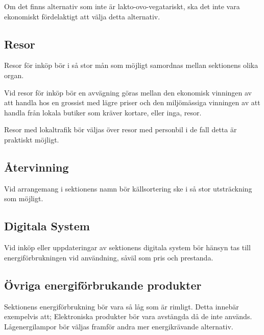\documentclass[11pt, includeaddress]{classes/cthit}
\begin{document}
Om det finns alternativ som inte är lakto-ovo-vegatariskt, ska det inte vara ekonomiskt fördelaktigt att välja detta alternativ.

\subsection{Resor}
Resor för inköp bör i så stor mån som möjligt samordnas mellan sektionens olika organ.

Vid resor för inköp bör en avvägning göras mellan den ekonomisk vinningen av att handla hos en
grossist med lägre priser och den miljömässiga vinningen av att handla från lokala butiker som
kräver kortare, eller inga, resor.

Resor med lokaltrafik bör väljas över resor med personbil i de fall detta är praktiskt möjligt.

\subsection{Återvinning}
Vid arrangemang i sektionens namn bör källsortering ske i så stor utsträckning som möjligt.

\subsection{Digitala System}
Vid inköp eller uppdateringar av sektionens digitala system bör hänsyn tas till
energiförbrukningen vid användning, såväl som pris och prestanda.

\subsection{Övriga energiförbrukande produkter}
Sektionens energiförbrukning bör vara så låg som är rimligt. Detta innebär exempelvis att;
Elektroniska produkter bör vara avstängda då de inte används.
Lågenergilampor bör väljas framför andra mer energikrävande alternativ.
\end{document}
